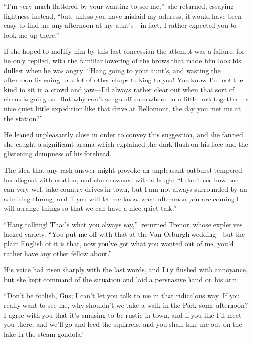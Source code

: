 \documentclass[12pt,a4paper]{book}
\begin{document}
``I'm very much flattered by your wanting to see me,''\ she
returned, essaying lightness instead, ``but, unless you have
mislaid my address, it would have been easy to find me any
afternoon at my aunt's---in fact, I rather expected you to look me
up there.''





If she hoped to mollify him by this last concession the attempt
was a failure, for he only replied, with the familiar lowering of
the brows that made him look his dullest when he was angry: ``Hang
going to your aunt's, and wasting the afternoon listening to a
lot of other chaps talking to you! You know I'm not the
kind to sit in a crowd and jaw---I'd always rather clear out when
that sort of circus is going on. But why can't we go off
somewhere on a little lark together---a nice quiet little
expedition like that drive at Bellomont, the day you met me at
the station?''





He leaned unpleasantly close in order to convey this suggestion,
and she fancied she caught a significant aroma which explained
the dark flush on his face and the glistening dampness of his
forehead.





The idea that any rash answer might provoke an unpleasant
outburst tempered her disgust with caution, and she answered with
a laugh: ``I don't see how one can very well take country drives
in town, but I am not always surrounded by an admiring throng,
and if you will let me know what afternoon you are coming I will
arrange things so that we can have a nice quiet talk.''





``Hang talking! That's what you always say,''\ returned Trenor,
whose expletives lacked variety. ``You put me off with that at the
Van Osburgh wedding---but the plain English of it is that, now
you've got what you wanted out of me, you'd rather have any other
fellow about.''





His voice had risen sharply with the last words, and Lily flushed
with annoyance, but she kept command of the situation and laid a
persuasive hand on his arm.





``Don't be foolish, Gus; I can't let you talk to me in that
ridiculous way. If you really want to see me, why shouldn't we
take a walk in the Park some afternoon? I agree with you that
it's amusing to be rustic in town, and if you like I'll meet you
there, and we'll go and feed the squirrels, and you shall take me
out on the lake in the steam-gondola.''
\end{document}
